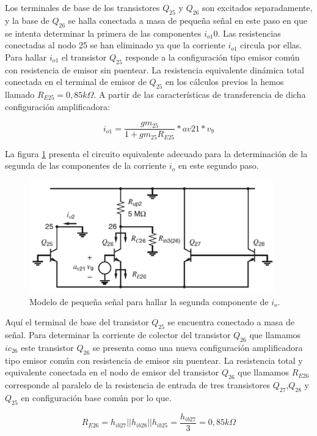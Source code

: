 \documentclass[12pt,a4paper,final,headinclude,footinclude,BCOR5mm]{scrartcl}
\begin{document}
Los terminales de base de los transistores $Q_{25}$ y $Q_{26}$ son excitados separadamente, y la base de $Q_{26}$ se halla conectada a masa  de pequeña señal en este paso en que se intenta determinar la primera de las componentes $i_{o1}$0. Las resistencias conectadas al nodo 25 se han eliminado ya que la corriente $i_{o1}$ circula por ellas. Para hallar $i_{o1}$ el transistor $Q_{25}$ responde a la configuración tipo emisor común con resistencia de emisor sin puentear. La resistencia equivalente dinámica total conectada en el terminal de emisor de $Q_{25}$ en los cálculos previos la hemos llamado $R_{E25} = 0,85 k\Omega$. A partir de las características de transferencia de dicha configuración amplificadora:

$$i_{o1} = \frac{gm_{25}}{1 + gm_{25}R_{E25}} * av21*v_{9}$$

La figura \ref{647} presenta el circuito equivalente adecuado para la determinación de la segunda de las componentes de la corriente $i_{o}$ en este segundo paso.

\begin{figure}[!h]
\begin{center}
\includegraphics[width=300pt]{./imagenes/647.png}
\end{center}
\caption{Modelo de pequeña señal para hallar la segunda componente de $i_{o}$.}
\label{647}
\end{figure}

Aquí el terminal de base del transistor $Q_{25}$ se encuentra conectado a masa de señal. Para determinar la corriente de colector del transistor $Q_{26}$ que llamamos $ic_{26}$ este transistor $Q_{26}$ se presenta como una nueva configuración amplificadora tipo emisor común con resistencia de emisor sin puentear. La resistencia total y equivalente conectada en el nodo de emisor del transistor $Q_{26}$ que llamamos $R_{E26}$ corresponde al paralelo de la resistencia de entrada de tres transistores $Q_{27}$,$Q_{28}$ y $Q_{25}$ en configuración base común por lo que.

$$R_{E26} = h_{ib27} || h_{ib28} || h_{ib25} = \frac{h_{ib27}}{3} = 0,85 k\Omega$$
\end{document}
